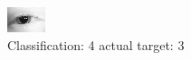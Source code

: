 \begin{figure}[h!]
\begin{center}
\includegraphics[width=0.60\columnwidth]{figures/ID136_class_4_target_3.png}
\end{center}
\caption{ Classification: 4 actual target: 3}
\label{fig:ID136_class_4_target_3}
\end{figure}
